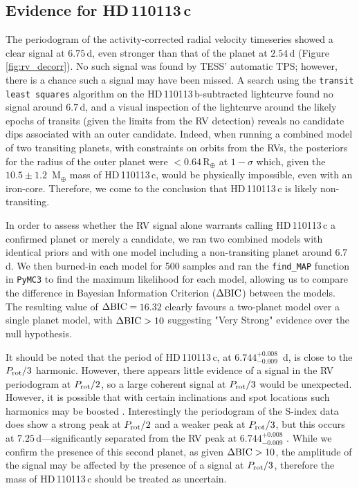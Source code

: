 \documentclass[fleqn,usenatbib]{mnras}
\newcommand{\rearth}{R$_{\oplus}$}
\newcommand{\mearth}{M$_{\oplus}$}
\newcommand{\TPone}{ $ 6.744^{+0.008}_{-0.009} $ }
\newcommand{\TMpone}{ $ 10.5 \pm 1.2 $ }
\newcommand{\Tplanet}{HD\,110113\,b}
\newcommand{\Tplanetc}{HD\,110113\,c}
\newcommand{\TdeltaBIC}{$16.32$}
\begin{document}
\subsection{Evidence for \Tplanetc{}}\label{sect:planetc}
The periodogram of the activity-corrected radial velocity timeseries showed a clear signal at $6.75$\,d, even stronger than that of the planet at $2.54$\,d (Figure \ref{fig:rv_decorr}).
No such signal was found by TESS' automatic TPS; however, there is a chance such a signal may have been missed.
A search using the \texttt{transit least squares} algorithm \citep{hippke2019optimized} on the \Tplanet{}-subtracted lightcurve found no signal around 6.7\,d, and a visual inspection of the lightcurve around the likely epochs of transits (given the limits from the RV detection) reveals no candidate dips associated with an outer candidate.
Indeed, when running a combined model of two transiting planets, with constraints on orbits from the RVs, the posteriors for the radius of the outer planet were $<0.64$\,\rearth{} at $1-\sigma$ which, given the \TMpone{}\,\mearth{} mass of \Tplanetc{}, would be physically impossible, even with an iron-core.
Therefore, we come to the conclusion that \Tplanetc{} is likely non-transiting.

In order to assess whether the RV signal alone warrants calling \Tplanetc{} a confirmed planet or merely a candidate, we ran two combined models with identical priors and with one model including a non-transiting planet around $6.7$d.
We then burned-in each model for 500 samples and ran the \texttt{find\_MAP} function in \texttt{PyMC3} to find the maximum likelihood for each model, allowing us to compare the difference in Bayesian Information Criterion ($\Delta{\rm BIC}$) between the models.
The resulting value of $\Delta{\rm BIC}= $\,\TdeltaBIC{} clearly favours a two-planet model over a single planet model, with $\Delta{\rm BIC}>10$ suggesting "Very Strong" evidence over the null hypothesis. 

It should be noted that the period of \Tplanetc{}, at \TPone{}\,d, is close to the $P_{\rm rot}/3$ harmonic.
However, there appears little evidence of a signal in the RV periodogram at $P_{\rm rot}/2$, so a large coherent signal at $P_{\rm rot}/3$ would be unexpected.
However, it is possible that with certain inclinations and spot locations such harmonics may be boosted \citep{vanderburg2016radial,boisse2011disentangling}.
Interestingly the periodogram of the S-index data does show a strong peak at $P_{\rm rot}/2$ and a weaker peak at $P_{\rm rot}/3$, but this occurs at $7.25$\,d---significantly separated from the RV peak at \TPone{}.
While we confirm the presence of this second planet, as given $\Delta{\rm BIC}>10$, the amplitude of the signal may be affected by the presence of a signal at $P_{\rm rot}/3$, therefore the mass of \Tplanetc{} should be treated as uncertain. 
\end{document}

